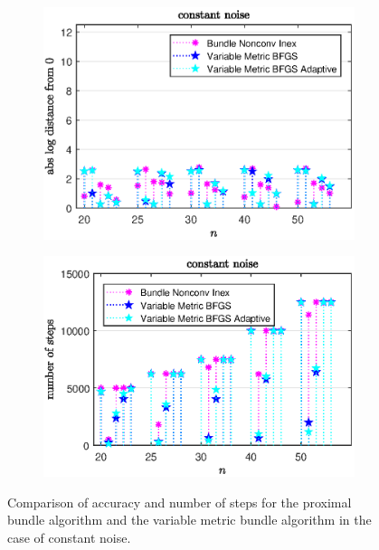 \vspace{-1.5em}

\begin{figure}[H]
	\begin{subfigure}{0.49\textwidth}
		\includegraphics[width=\textwidth]{Pictures/Plots/constant_noise_b.eps}%
	\end{subfigure}%
	\hfill
	\begin{subfigure}{0.49\textwidth}
		\includegraphics[width=\textwidth]{Pictures/Plots/steps_constant_noise_b.eps}%
	\end{subfigure}
	\vspace{-.5em}
	\caption[Accuracy and number of steps: constant noise, higher dimensions]{Comparison of accuracy and number of steps for the proximal bundle algorithm and the variable metric bundle algorithm in the case of constant noise.}%
	\label{fig_const_noise_large}%
\end{figure}

